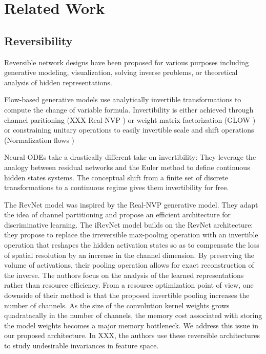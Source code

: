 \documentclass[twocolumn]{bmcart}
\begin{document}
\section{Related Work}
\subsection{Reversibility}

Reversible network designs have been proposed for various purposes including generative modeling, visualization, solving inverse problems, or theoretical analysis of hidden representations.

Flow-based generative models use analytically invertible transformations to compute the change of variable formula. Invertibility is either achieved through channel paritioning (XXX \cite{} Real-NVP \cite{}) or weight matrix factorization (GLOW \cite{}) or constraining unitary operations to easily invertible scale and shift operations (Normalization flows \cite{})

Neural ODEs take a drastically different take on invertibility: They leverage the analogy between residual networks and the Euler method to define continuous hidden states systems.
The conceptual shift from a finite set of discrete transformations to a continuous regime gives them invertibility for free. 

The RevNet model \cite{} was inspired by the Real-NVP generative model. They adapt the idea of channel partitioning and propose an efficient architecture for discriminative learning.
The iRevNet model builds on the RevNet architecture: they propose to replace the irreversible max-pooling operation with an invertible operation that reshapes the hidden activation states
so as to compensate the loss of spatial resolution by an increase in the channel dimension. 
By preserving the volume of activations, their pooling operation allows for exact reconstruction of the inverse.
The authors focus on the analysis of the learned representations rather than resource efficiency.
From a resource optimization point of view, one downside of their method is that the proposed invertible pooling increases the number of channels.
As the size of the convolution kernel weights grows quadratacally in the number of channels, the memory cost associated with storing the model weights becomes a major memory bottleneck.
We address this issue in our proposed architecture.
In XXX, the authors use these reversible architectures to study undesirable invariances in feature space.
\end{document}

